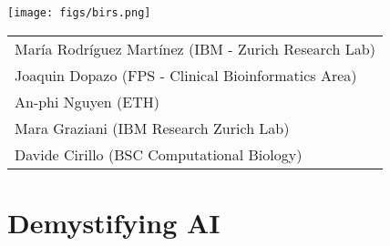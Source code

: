 \documentclass[compress,ignorenonframetext,aspectratio=1610]{beamer}
\newcommand{\tabitem}{%
  \usebeamertemplate{itemize item}\hspace*{\labelsep}}
\begin{document}
\begin{frame}

	\begin{center}
		\texttt{[image: figs/birs.png]}
	\end{center}


   
   			
			


	\begin{center}
		\begin{tabular}{@{}l@{}}
		\pause
		\tabitem María Rodríguez Martínez (IBM - Zurich Research Lab) \\
		\pause
		\tabitem Joaquin Dopazo (FPS - Clinical Bioinformatics Area) \\
		\tabitem An-phi Nguyen (ETH) \\
		\tabitem Mara Graziani (IBM Research Zurich Lab) \\
		\tabitem Davide Cirillo (BSC Computational Biology) \\
		\end{tabular}
	\end{center}
\end{frame}

\section{Demystifying AI}
\end{document}

